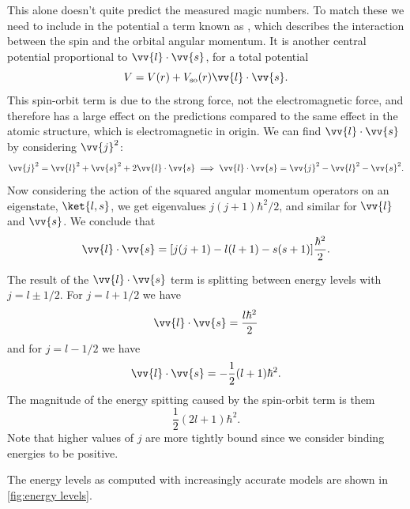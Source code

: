 \documentclass[fleqn]{NotesClass}
\begin{document}
    This alone doesn't quite predict the measured magic numbers.
    To match these we need to include in the potential a term known as , which describes the interaction between the spin and the orbital angular momentum.
    It is another central potential proportional to \(\vv{l}\cdot\vv{s}\), for a total potential
    \begin{equation}
        V = V(r) + V_{\mathrm{so}}(r)\vv{l}\cdot\vv{s}.
    \end{equation}
    This spin-orbit term is due to the strong force, not the electromagnetic force, and therefore has a large effect on the predictions compared to the same effect in the atomic structure, which is electromagnetic in origin.
    We can find \(\vv{l}\cdot\vv{s}\) by considering \(\vv{j}^2\):
    \begin{equation}
        \vv{j}^2 = \vv{l}^2 + \vv{s}^2 + 2\vv{l}\cdot\vv{s} \implies \vv{l}\cdot\vv{s} = \vv{j}^2 - \vv{l}^2 - \vv{s}^2.
    \end{equation}
    Now considering the action of the squared angular momentum operators on an eigenstate, \(\ket{l, s}\), we get eigenvalues \(j(j+1)\hbar^2/2\), and similar for \(\vv{l}\) and \(\vv{s}\).
    We conclude that
    \begin{equation}
        \vv{l}\cdot\vv{s} = [j(j + 1) - l(l + 1) - s(s + 1)]\frac{\hbar^2}{2}.
    \end{equation}
    
    The result of the \(\vv{l}\cdot\vv{s}\) term is splitting between energy levels with \(j = l \pm 1/2\).
    For \(j = l + 1/2\) we have
    \begin{equation}
        \vv{l}\cdot\vv{s} = \frac{l\hbar^2}{2}
    \end{equation}
    and for \(j = l - 1/2\) we have
    \begin{equation}
        \vv{l}\cdot\vv{s} = -\frac{1}{2}(l + 1)\hbar^2.
    \end{equation}
    The magnitude of the energy spitting caused by the spin-orbit term is them
    \begin{equation}
        \frac{1}{2}(2l + 1)\hbar^2.
    \end{equation}
    Note that higher values of \(j\) are more tightly bound since we consider binding energies to be positive.
    
    The energy levels as computed with increasingly accurate models are shown in \cref{fig:energy levels}.
    
\end{document}
